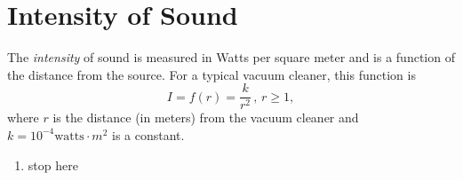 \documentclass{ximera}
\begin{document}
\section{Intensity of Sound}

\begin{question}  \label{Qdfdgt446666}
The \emph{intensity} of sound is measured in Watts per square meter and is a function of the distance from the source. For a typical vacuum cleaner, this function is
\[
          I = f(r) = \frac{k}{r^2} \, , \, r\geq 1 ,
\]
where $r$ is the distance (in meters) from the vacuum cleaner and $k=10^{-4}\text{watts}\cdot m^2$ is a constant.

\begin{enumerate}
\item stop here
\end{enumerate}

\end{question}
\end{document}
